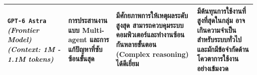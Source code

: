 \begin{table}[H]
\begin{tabularx}{\textwidth}{
      >{\raggedright\arraybackslash}p{}
      |
      >{\raggedright\arraybackslash}X
      >{\raggedright\arraybackslash}X
      >{\raggedright\arraybackslash}X
    }
    \hline
    
    \texttt{GPT-6 Astra} \newline \textit{(Frontier Model)} \newline \textit{(Context: 1M - 1.1M tokens)} &
    การประสานงานแบบ Multi-agent และการแก้ปัญหาที่ซับซ้อนขั้นสุด &
    มีศักยภาพการให้เหตุผลระดับสูงสุด สามารถควบคุมระบบคอมพิวเตอร์และทำงานซ้อนกันหลายขั้นตอน (Complex reasoning) ได้ดีเยี่ยม &
    มีต้นทุนการใช้งานที่สูงที่สุดในกลุ่ม อาจเกินความจำเป็นสำหรับระบบทั่วไป และมักมีข้อจำกัดด้านโควตาการใช้งานอย่างเข้มงวด \\

    \hline
  \end{tabularx}
\end{table}

 
 
 
 
